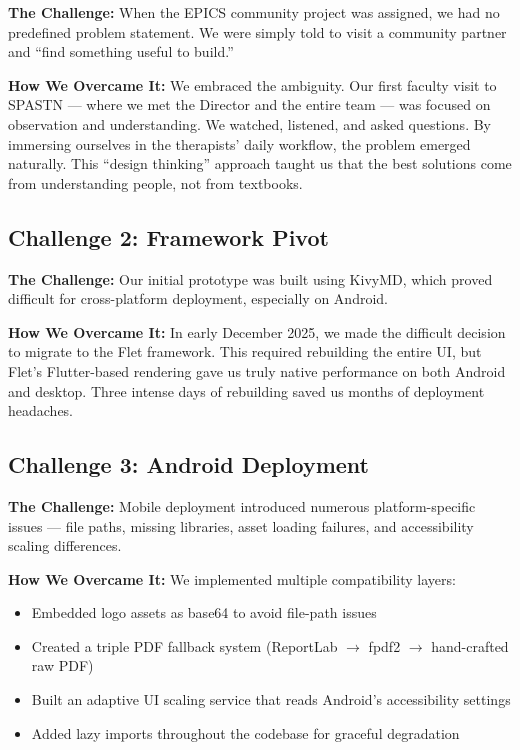 \documentclass[11pt,a4paper]{article}
\begin{document}
\textbf{The Challenge:} When the EPICS community project was assigned, we had no predefined problem statement. We were simply told to visit a community partner and ``find something useful to build.''

\textbf{How We Overcame It:} We embraced the ambiguity. Our first faculty visit to SPASTN --- where we met the Director and the entire team --- was focused on observation and understanding. We watched, listened, and asked questions. By immersing ourselves in the therapists' daily workflow, the problem emerged naturally. This ``design thinking'' approach taught us that the best solutions come from understanding people, not from textbooks.

\subsection{Challenge 2: Framework Pivot}

\textbf{The Challenge:} Our initial prototype was built using KivyMD, which proved difficult for cross-platform deployment, especially on Android.

\textbf{How We Overcame It:} In early December 2025, we made the difficult decision to migrate to the Flet framework. This required rebuilding the entire UI, but Flet's Flutter-based rendering gave us truly native performance on both Android and desktop. Three intense days of rebuilding saved us months of deployment headaches.

\subsection{Challenge 3: Android Deployment}

\textbf{The Challenge:} Mobile deployment introduced numerous platform-specific issues --- file paths, missing libraries, asset loading failures, and accessibility scaling differences.

\textbf{How We Overcame It:} We implemented multiple compatibility layers:
\begin{itemize}[leftmargin=2em, itemsep=2pt]
    \item Embedded logo assets as base64 to avoid file-path issues
    \item Created a triple PDF fallback system (ReportLab $\rightarrow$ fpdf2 $\rightarrow$ hand-crafted raw PDF)
    \item Built an adaptive UI scaling service that reads Android's accessibility settings
    \item Added lazy imports throughout the codebase for graceful degradation
\end{itemize}
\end{document}
